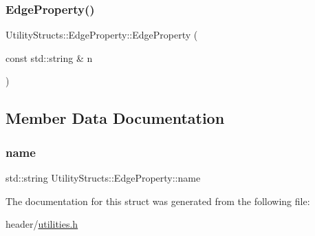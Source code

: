 \subsubsection{\texorpdfstring{Edge\+Property()}{EdgeProperty()}}
{\footnotesize\ttfamily Utility\+Structs\+::\+Edge\+Property\+::\+Edge\+Property (\begin{DoxyParamCaption}\item[{const std\+::string \&}]{n }\end{DoxyParamCaption})\hspace{0.3cm}{\ttfamily [inline]}}



\subsection{Member Data Documentation}
\mbox{\label{struct_utility_structs_1_1_edge_property_a0701d898f719b1efbf795d80f503de81}} 
\subsubsection{\texorpdfstring{name}{name}}
{\footnotesize\ttfamily std\+::string Utility\+Structs\+::\+Edge\+Property\+::name}



The documentation for this struct was generated from the following file\+:\begin{DoxyCompactItemize}
\item 
header/\hyperlink{utilities_8h}{utilities.\+h}\end{DoxyCompactItemize}
